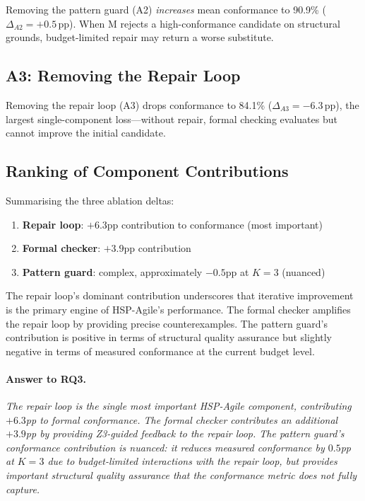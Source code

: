 Removing the pattern guard (A2) \emph{increases} mean conformance to 90.9\%
($\Delta_{A2} = +0.5$\,pp).  When M rejects a high-conformance candidate on
structural grounds, budget-limited repair may return a worse substitute.

\subsection{A3: Removing the Repair Loop}

Removing the repair loop (A3) drops conformance to 84.1\% ($\Delta_{A3} = -6.3$\,pp),
the largest single-component loss---without repair, formal checking evaluates but
cannot improve the initial candidate.

\subsection{Ranking of Component Contributions}

Summarising the three ablation deltas:
\begin{enumerate}
  \item \textbf{Repair loop}: $+6.3$pp contribution to conformance (most important)
  \item \textbf{Formal checker}: $+3.9$pp contribution
  \item \textbf{Pattern guard}: complex, approximately $-0.5$pp at $K=3$ (nuanced)
\end{enumerate}

The repair loop's dominant contribution underscores that iterative improvement is the
primary engine of HSP-Agile's performance.  The formal checker amplifies the repair
loop by providing precise counterexamples.  The pattern guard's contribution is
positive in terms of structural quality assurance but slightly negative in terms of
measured conformance at the current budget level.

\paragraph{Answer to RQ3.}
\emph{The repair loop is the single most important HSP-Agile component, contributing
$+6.3$pp to formal conformance.  The formal checker contributes an additional
$+3.9$pp by providing Z3-guided feedback to the repair loop.  The pattern guard's
conformance contribution is nuanced: it reduces measured conformance by $0.5$pp at
$K=3$ due to budget-limited interactions with the repair loop, but provides important
structural quality assurance that the conformance metric does not fully capture.}


